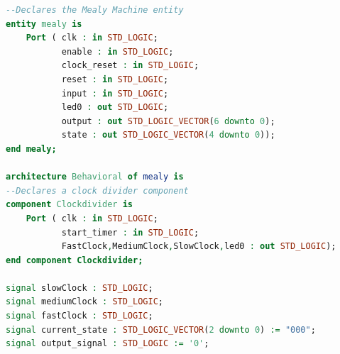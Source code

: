 \documentclass[11pt]{article}
\begin{document}
\begin{appendices}
\begin{lstlisting}[language=VHDL]
--Declares the Mealy Machine entity
entity mealy is
    Port ( clk : in STD_LOGIC;
           enable : in STD_LOGIC;
           clock_reset : in STD_LOGIC;
           reset : in STD_LOGIC;
           input : in STD_LOGIC;
           led0 : out STD_LOGIC;
           output : out STD_LOGIC_VECTOR(6 downto 0);
           state : out STD_LOGIC_VECTOR(4 downto 0));
end mealy;

architecture Behavioral of mealy is
--Declares a clock divider component
component Clockdivider is
    Port ( clk : in STD_LOGIC;
           start_timer : in STD_LOGIC;
           FastClock,MediumClock,SlowClock,led0 : out STD_LOGIC);
end component Clockdivider;

signal slowClock : STD_LOGIC;
signal mediumClock : STD_LOGIC;
signal fastClock : STD_LOGIC;
signal current_state : STD_LOGIC_VECTOR(2 downto 0) := "000";
signal output_signal : STD_LOGIC := '0'; 


\end{lstlisting}
\end{appendices}
\end{document}
